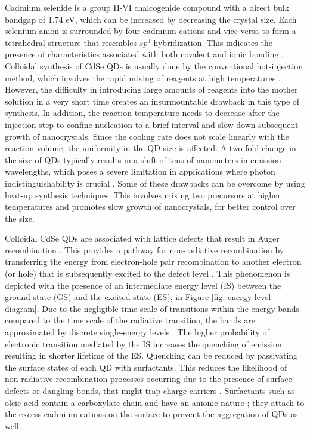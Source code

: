 \documentclass[%
 aip,
 amsmath,amssymb,
 reprint,%
]{revtex4-1}
\begin{document}
Cadmium selenide is a group II-VI chalcogenide compound with a direct bulk bandgap of 1.74 eV, which can be increased by decreasing the crystal size. Each selenium anion is surrounded by four cadmium cations and vice versa to form a tetrahedral structure that resembles $sp^3$ hybridization. This indicates the presence of characteristics associated with both covalent and ionic bonding \cite{AAE}. Colloidal  synthesis of CdSe QDs is usually done by the conventional hot-injection method, which involves the rapid mixing of reagents at high temperatures \cite{NN}. However, the difficulty in introducing large amounts of reagents into the mother solution in a very short time creates an insurmountable drawback in this type of synthesis. In addition, the reaction temperature needs to decrease after the injection step to confine nucleation to a brief interval and slow down subsequent growth of nanocrystals. Since the cooling rate does not scale linearly with the reaction volume, the uniformity in the QD size is affected\cite{FF}. A two-fold change in the size of QDs typically results in a shift of tens of nanometers in emission wavelengths, which poses a severe limitation in applications where photon indistinguishability is crucial \cite{GG}. Some of these drawbacks can be overcome by using heat-up synthesis techniques. This  involves mixing two precursors at higher temperatures and promotes slow growth of nanocrystals, for better control over the size.

Colloidal CdSe QDs are associated with lattice defects that result in Auger recombination \cite{II}. This provides a pathway for non-radiative recombination by transferring the energy from electron-hole pair recombination to another electron (or hole) that is subsequently excited to the defect level \cite{UU}. This phenomenon is depicted with the presence of an intermediate energy level (IS) between the ground state (GS) and the excited state (ES),  in Figure \ref{fig: energy level diagram}. Due to the negligible time scale of transitions within the energy bands compared to the time scale of the radiative transition, the bands are approximated by discrete single-energy levels \cite{TT}. The higher probability of electronic transition mediated by the IS increases the quenching of emission \cite{UU} resulting in shorter lifetime \cite{AAJ} of the ES. Quenching can be reduced by passivating the surface states of each QD with surfactants. This reduces the likelihood of non-radiative recombination processes occurring due to the presence of surface defects or dangling bonds, that might trap charge carriers \cite{AAU}. Surfactants such as oleic acid contain a carboxylate chain and have an anionic nature \cite{AAF}; they attach to the excess cadmium cations on the surface to prevent the aggregation of QDs as well. 
\end{document}
